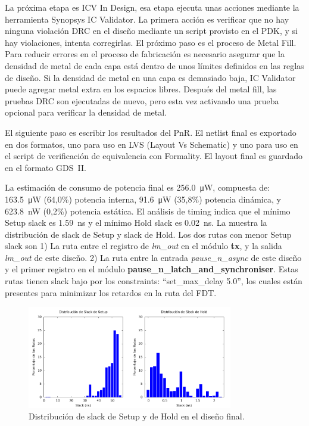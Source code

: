 \documentclass[a4paper, twoside, 11pt]{report}
\begin{document}
La próxima etapa es ICV In Design, esa etapa ejecuta unas acciones mediante la herramienta Synopsys IC Validator. La primera acción es verificar que no hay ninguna violación DRC en el diseño mediante un script provisto en el PDK, y si hay violaciones, intenta corregirlas. El próximo paso es el proceso de Metal Fill. Para reducir errores en el proceso de fabricación es necesario asegurar que la densidad de metal de cada capa está dentro de unos límites definidos en las reglas de diseño. Si la densidad de metal en una capa es demasiado baja, IC Validator puede agregar metal extra en los espacios libres. Después del metal fill, las pruebas DRC son ejecutadas de nuevo, pero esta vez activando una prueba opcional para verificar la densidad de metal.

El siguiente paso es escribir los resultados del PnR. El netlist final es exportado en dos formatos, uno para uso en LVS (Layout Vs Schematic) y uno para uso en el script de verificación de equivalencia con Formality. El layout final es guardado en el formato GDS~II.

La estimación de consumo de potencia final es \SI{256.0}{\micro\watt}, compuesta de: \SI{163.5}{\micro\watt} (64,0\%) potencia interna, \SI{91.6}{\micro\watt} (35,8\%) potencia dinámica, y \SI{623.8}{\nano\watt} (0,2\%) potencia estática. El análisis de timing indica que el mínimo Setup slack es \SI{1,59}{\nano\second} y el mínimo Hold slack es \SI{0.02}{\nano\second}. La  muestra la distribución de slack de Setup y slack de Hold. Los dos rutas con menor Setup slack son 1) La ruta entre el registro de \textit{lm\_out} en el módulo \textbf{tx}, y la salida \textit{lm\_out} de este diseño. 2) La ruta entre la entrada \textit{pause\_n\_async} de este diseño y el primer registro en el módulo \textbf{pause\_n\_latch\_and\_synchroniser}. Estas rutas tienen slack bajo por los constraints: “set\_max\_delay 5.0”, los cuales están presentes para minimizar los retardos en la ruta del FDT.

\begin{figure}[htb]
  \centering
  \includegraphics[width=0.8\textwidth]{./img/slack}
  \caption{Distribución de slack de Setup y de Hold en el diseño final.}
  \label{fig:setup_hold_slack}
\end{figure}
\end{document}
